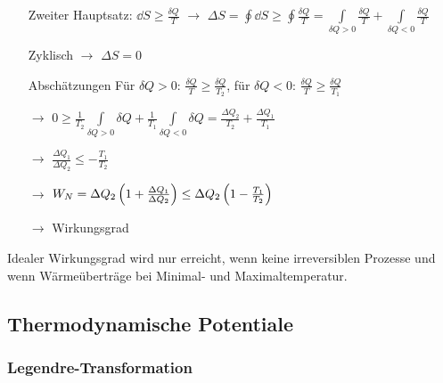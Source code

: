 \begin{itemize}[align=left]
  \item[Zweiter Hauptsatz:] $\dd{S} \geq \frac{\delta Q}{T}$ $\rightarrow$ $\Delta S = \oint \dd{S} \geq \oint \frac{\delta Q}{T} = \int\limits_{\delta Q > 0} \frac{\delta Q}{T} + \int\limits_{\delta Q < 0} \frac{\delta Q} {T}$
  \item[Zyklisch] $\rightarrow$ $\Delta S = 0$
  \item[Abschätzungen] Für $\delta Q > 0$: $\frac{\delta Q}{T} \geq\frac{\delta Q}{T_2}$, für $\delta Q < 0$: $\frac{\delta Q}{T} \geq \frac{\delta Q}{T_1}$
  \item[$\rightarrow$] $0 \geq \frac{1}{T_2} \int\limits_{\delta Q > 0} \delta Q + \frac{1}{T_1} \int\limits_{\delta Q  < 0} \delta Q = \frac{\Delta Q_2}{T_2} +\frac{\Delta Q_1}{T_1}$
  \item[$\rightarrow$] $\frac{\Delta Q_1}{\Delta Q_2} \leq - \frac{T_1}{T_2}$
  \item[$\rightarrow$] $W_N = \Delta Q_2\left( 1 + \frac{\Delta Q_1}{\Delta Q_2} \right) \leq \Delta Q_2\left( 1- \frac{T_1}{T_2} \right)$
  \item[$\rightarrow$] Wirkungsgrad 
\end{itemize}

Idealer Wirkungsgrad wird nur erreicht, wenn keine irreversiblen Prozesse und wenn Wärmeüberträge bei Minimal- und Maximaltemperatur.

\subsection{Thermodynamische Potentiale}
\subsubsection{Legendre-Transformation}

